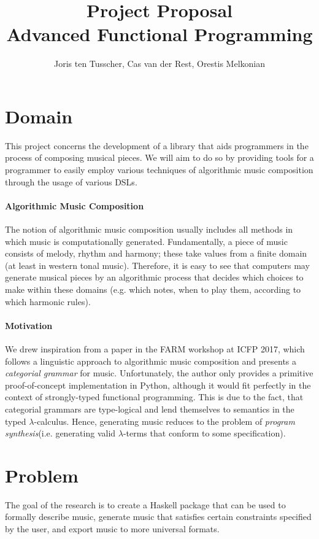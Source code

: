 \documentclass[11pt,a4paper]{article}
\title{\textbf{Project Proposal \\ \small{Advanced Functional Programming}}}
\author{\small{Joris ten Tusscher, Cas van der Rest, Orestis Melkonian}}
\date{}
\begin{document}
\maketitle
\vspace{-50pt}

\section{Domain}
This project concerns the development of a library that aids programmers in the process of composing musical pieces. We will aim to do so by providing tools for a programmer to easily employ various techniques of algorithmic music composition through the usage of various DSLs.\vspace{-10pt}
\paragraph{Algorithmic Music Composition}
The notion of algorithmic music composition usually includes all methods in which music is computationally generated. Fundamentally, a piece of music consists of melody, rhythm and harmony; these take values from a finite domain (at least in western tonal music). Therefore, it is easy to see that computers may generate musical pieces by an algorithmic process that decides which choices to make within these domains (e.g. which notes, when to play them, according to which harmonic rules).
\vspace{-10pt}
\paragraph{Motivation}
We drew inspiration from a paper in the FARM workshop at ICFP 2017, which follows a linguistic approach to algorithmic music composition and presents a \textit{categorial grammar} for music\cite{categorial}. Unfortunately, the author only provides a primitive proof-of-concept implementation in Python, although it would fit perfectly in the context of strongly-typed functional programming. This is due to the fact, that categorial grammars are type-logical and lend themselves to semantics in the typed $\lambda$-calculus\cite{moortgat}. Hence, generating music reduces to the problem of \textit{program synthesis}(i.e. generating valid $\lambda$-terms that conform to some specification).

\section{Problem}
The goal of the research is to create a Haskell package that can be used to formally describe music, generate music that satisfies certain constraints specified by the user, and export music to more universal formats.
\end{document}
